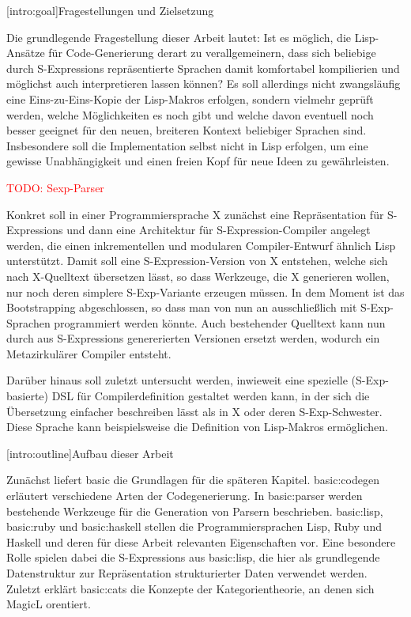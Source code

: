 \documentclass[a4paper, bibgerm]{article}
\newcommand{\todo}[1]{
  \textcolor{red}{TODO: #1}
}
\newcommand\lsubsection{}
\newcommand\cref{}
\newcommand\sref{}
\begin{document}
\lsubsection[intro:goal]{Fragestellungen und Zielsetzung}

Die grundlegende Fragestellung dieser Arbeit lautet: Ist es möglich, die
Lisp-Ansätze für Code-Generierung derart zu verallgemeinern, dass sich
beliebige durch S-Expressions repräsentierte Sprachen damit komfortabel
kompilierien und möglichst auch interpretieren lassen können? Es soll
allerdings nicht zwangsläufig eine Eins-zu-Eins-Kopie der Lisp-Makros
erfolgen, sondern vielmehr geprüft werden, welche Möglichkeiten es noch
gibt und welche davon eventuell noch besser geeignet für den neuen,
breiteren Kontext beliebiger Sprachen sind. Insbesondere soll die
Implementation selbst nicht in Lisp erfolgen, um eine gewisse
Unabhängigkeit und einen freien Kopf für neue Ideen zu gewährleisten.

\todo{Sexp-Parser}

Konkret soll in einer Programmiersprache X zunächst eine Repräsentation
für S-Expressions und dann eine Architektur für S-Expression-Compiler
angelegt werden, die einen inkrementellen und modularen Compiler-Entwurf
ähnlich Lisp unterstützt. Damit soll eine S-Expression-Version von X
entstehen, welche sich nach X-Quelltext übersetzen lässt, so dass
Werkzeuge, die X generieren wollen, nur noch deren simplere
S-Exp-Variante erzeugen müssen. In dem Moment ist das Bootstrapping
abgeschlossen, so dass man von nun an ausschließlich mit S-Exp-Sprachen
programmiert werden könnte. Auch bestehender Quelltext kann nun durch aus
S-Expressions genererierten Versionen ersetzt werden, wodurch ein
Metazirkulärer Compiler entsteht.

Darüber hinaus soll zuletzt untersucht werden, inwieweit eine spezielle
(S-Exp-basierte) DSL für Compilerdefinition gestaltet werden kann, in
der sich die Übersetzung einfacher beschreiben lässt als in X
oder deren S-Exp-Schwester. Diese Sprache kann beispielsweise die
Definition von Lisp-Makros ermöglichen.

\lsubsection[intro:outline]{Aufbau dieser Arbeit}

Zunächst liefert \cref{basic} die Grundlagen für die späteren Kapitel.
\sref{basic:codegen} erläutert verschiedene Arten der
Codegenerierung. In \sref{basic:parser} werden bestehende Werkzeuge für
die Generation von Parsern beschrieben. \sref{basic:lisp},
\sref{basic:ruby} und \sref{basic:haskell} stellen die
Programmiersprachen Lisp, Ruby und Haskell und deren für diese Arbeit
relevanten Eigenschaften vor. Eine besondere Rolle spielen dabei die
S-Expressions aus \sref {basic:lisp}, die hier als grundlegende
Datenstruktur zur Repräsentation strukturierter Daten verwendet
werden. Zuletzt erklärt \sref{basic:cats} die Konzepte der
Kategorientheorie, an denen sich MagicL orentiert.
\end{document}
